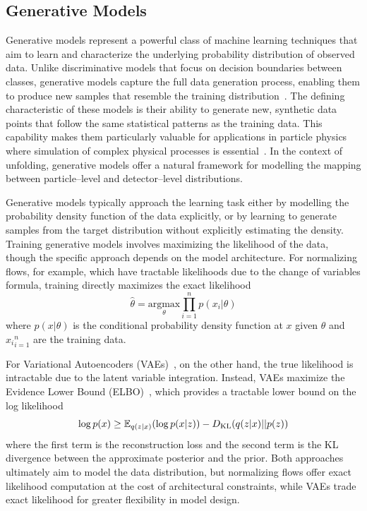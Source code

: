 \subsection{Generative Models}
    Generative models represent a powerful class of machine learning techniques that aim to learn and characterize the underlying probability distribution of observed data.
    Unlike discriminative models that focus on decision boundaries between classes, generative models capture the full data generation process, enabling them to produce new samples that resemble the training distribution~\cite{Kansal2023EvaluatingPhysics}.
    The defining characteristic of these models is their ability to generate new, synthetic data points that follow the same statistical patterns as the training data.
    This capability makes them particularly valuable for applications in particle physics where simulation of complex physical processes is essential~\cite{Carleo2019MachineSciences, Albergo2019Flow-basedSHANAHAN}.
    In the context of unfolding, generative models offer a natural framework for modelling the mapping between particle--level and detector--level distributions.
    
    Generative models typically approach the learning task either by modelling the probability density function of the data explicitly, or by learning to generate samples from the target distribution without explicitly estimating the density.
    Training generative models involves maximizing the likelihood of the data, though the specific approach depends on the model architecture.
    For normalizing flows, for example, which have tractable likelihoods due to the change of variables formula, training directly maximizes the exact likelihood
    \begin{equation}
        \hat{\theta} = \underset{\theta}{\text{argmax}} \prod_{i=1}^{n} p(x_i | \theta)
    \end{equation}
    where \(p(x | \theta)\) is the conditional probability density function at \(x\) given \(\theta\) and \({x_i}_{i=1}^{n}\) are the training data.
    
    For Variational Autoencoders (VAEs)~\cite{Kingma2013Auto-EncodingBayes}, on the other hand, the true likelihood is intractable due to the latent variable integration.
    Instead, VAEs maximize the Evidence Lower Bound (ELBO)~\cite{Kingma2019AnAutoencoders}, which provides a tractable lower bound on the log likelihood
    \begin{equation}
    \label{eq:ELBO}
        \log p(x) \geq \mathbb{E}_{q(z|x)}\qty(\log p(x|z)) - D_{\text{KL}}(q(z|x) || p(z))
    \end{equation}
    where the first term is the reconstruction loss and the second term is the KL divergence between the approximate posterior and the prior.
    Both approaches ultimately aim to model the data distribution, but normalizing flows offer exact likelihood computation at the cost of architectural constraints, while VAEs trade exact likelihood for greater flexibility in model design.
